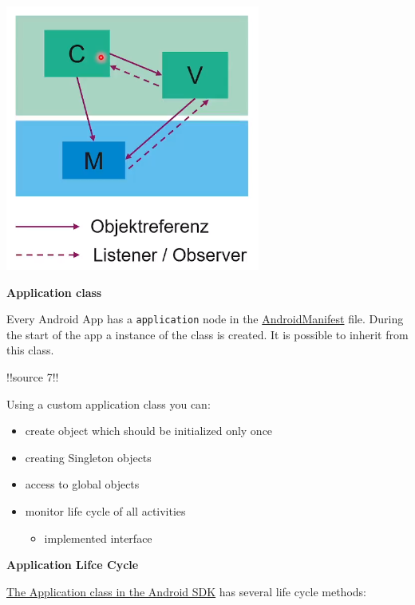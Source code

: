 \documentclass[11pt,twoside,landscape]{article}
\begin{document}
\begin{multicols}{3}
\begin{center}
\includegraphics[width=.9\linewidth]{img/mvc.png}
\end{center}


\textbf{Application class}

Every Android App has a \texttt{application} node in the \href{../../../roam/20210921175054-androidmanifest.org}{AndroidManifest} file.
During the start of the app a instance of the class is created.
It is possible to inherit from this class.

!!source 7!!

Using a custom application class you can:
\begin{itemize}
\item create object which should be initialized only once
\item creating Singleton objects
\item access to global objects
\item monitor life cycle of all activities
\begin{itemize}
\item implemented interface
\end{itemize}
\end{itemize}

\textbf{Application Lifce Cycle}

\href{../../../roam/20211103155952-the_application_class_in_the_android_sdk.org}{The Application class in the Android SDK} has several life cycle methods:


\end{multicols}
\end{document}
